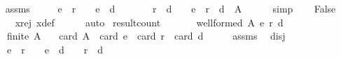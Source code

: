 \begin{isabellebody}
\ \ \isamarkupfalse%
\ assms\ \isamarkupfalse%
\isanewline
\ \ \ \ {\isachardoublequoteopen}{\isacharparenleft}{\kern0pt}e\ {\isasyminter}\ r\ {\isacharequal}{\kern0pt}\ {\isacharbraceleft}{\kern0pt}{\isacharbraceright}{\kern0pt}{\isacharparenright}{\kern0pt}\ {\isasymand}\ {\isacharparenleft}{\kern0pt}e\ {\isasyminter}\ d\ {\isacharequal}{\kern0pt}\ {\isacharbraceleft}{\kern0pt}{\isacharbraceright}{\kern0pt}{\isacharparenright}{\kern0pt}\ {\isasymand}\isanewline
\ \ \ \ {\isacharparenleft}{\kern0pt}r\ {\isasyminter}\ d\ {\isacharequal}{\kern0pt}\ {\isacharbraceleft}{\kern0pt}{\isacharbraceright}{\kern0pt}{\isacharparenright}{\kern0pt}\ {\isasymand}\ {\isacharparenleft}{\kern0pt}e\ {\isasymunion}\ r\ {\isasymunion}\ d\ {\isacharequal}{\kern0pt}\ A{\isacharparenright}{\kern0pt}{\isachardoublequoteclose}\isanewline
\ \ \ \ \isamarkupfalse%
\ simp\isanewline
\ \ \isamarkupfalse%
\ {\isachardoublequoteopen}False{\isachardoublequoteclose}\isanewline
\ \ \ \ \isamarkupfalse%
\ x{\isacharunderscore}{\kern0pt}rej\ x{\isacharunderscore}{\kern0pt}def\isanewline
\ \ \ \ \isamarkupfalse%
\ auto\isanewline
{}\isamarkupfalse%
%
\endisatagproof
{\isafoldproof}%
%
\isadelimproof
\isanewline
%
\endisadelimproof
\isanewline
{}\isamarkupfalse%
\ result{\isacharunderscore}{\kern0pt}count{\isacharcolon}{\kern0pt}\isanewline
\ \ \isanewline
\ \ \ \ {\isachardoublequoteopen}well{\isacharunderscore}{\kern0pt}formed\ A\ {\isacharparenleft}{\kern0pt}e{\isacharcomma}{\kern0pt}\ r{\isacharcomma}{\kern0pt}\ d{\isacharparenright}{\kern0pt}{\isachardoublequoteclose}\ \isanewline
\ \ \ \ {\isachardoublequoteopen}finite\ A{\isachardoublequoteclose}\isanewline
\ \ \ {\isachardoublequoteopen}card\ A\ {\isacharequal}{\kern0pt}\ card\ e\ {\isacharplus}{\kern0pt}\ card\ r\ {\isacharplus}{\kern0pt}\ card\ d{\isachardoublequoteclose}\isanewline
%
\isadelimproof
%
\endisadelimproof
%
\isatagproof
{}\isamarkupfalse%
\ {\isacharminus}{\kern0pt}\isanewline
\ \ \isamarkupfalse%
\ assms{\isacharparenleft}{\kern0pt}{}{\isacharparenright}{\kern0pt}\ \isamarkupfalse%
\ disj{\isacharcolon}{\kern0pt}\isanewline
\ \ \ \ {\isachardoublequoteopen}{\isacharparenleft}{\kern0pt}e\ {\isasyminter}\ r\ {\isacharequal}{\kern0pt}\ {\isacharbraceleft}{\kern0pt}{\isacharbraceright}{\kern0pt}{\isacharparenright}{\kern0pt}\ {\isasymand}\ {\isacharparenleft}{\kern0pt}e\ {\isasyminter}\ d\ {\isacharequal}{\kern0pt}\ {\isacharbraceleft}{\kern0pt}{\isacharbraceright}{\kern0pt}{\isacharparenright}{\kern0pt}\ {\isasymand}\ {\isacharparenleft}{\kern0pt}r\ {\isasyminter}\ d\ {\isacharequal}{\kern0pt}\ {\isacharbraceleft}{\kern0pt}{\isacharbraceright}{\kern0pt}{\isacharparenright}{\kern0pt}{\isachardoublequoteclose}\isanewline

\end{isabellebody}
